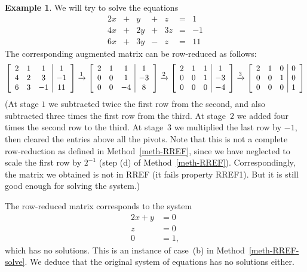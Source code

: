\documentclass[reqno]{amsart}
\theoremstyle{definition}
\newtheorem{example}[theorem]{Example}
\begin{document}
\begin{example}\label{eg-lineqs-i}
 We will try to solve the equations
 \[
 \begin{array}{rcrcrcr}
 2x & + &  y & + &  z & = &  1  \\
 4x & + & 2y & + & 3z & = & -1  \\
 6x & + & 3y & - &  z & = & 11
 \end{array}
 \]
 The corresponding augmented matrix can be row-reduced as follows:
 \[
 \left[
 \begin{array}{ccc|c}
 2 & 1 & 1 & 1 \\
 4 & 2 & 3 & -1 \\
 6 & 3 & -1 & 11
 \end{array}
 \right] \xrightarrow{1} \left[
 \begin{array}{ccc|c}
 2 & 1 & 1 & 1 \\
 0 & 0 & 1 & -3 \\
 0 & 0 & -4 & 8
 \end{array}
 \right] \xrightarrow{2}
 \left[
 \begin{array}{ccc|c}
 2 & 1 & 1 & 1 \\
 0 & 0 & 1 & -3 \\
 0 & 0 & 0 & -4
 \end{array}
 \right] \xrightarrow{3}
 \left[
 \begin{array}{ccc|c}
 2 & 1 & 0 & 0 \\
 0 & 0 & 1 & 0 \\
 0 & 0 & 0 & 1
 \end{array}
 \right]
 \]
 (At stage $1$ we subtracted twice the first row from the second, and
 also subtracted three times the first row from the third.  At
 stage~$2$ we added four times the second row to the third.  At
 stage~$3$ we multiplied the last row by $-1$, then cleared the
 entries above all the pivots.
 Note that this is not a complete row-reduction as defined in
 Method~\ref{meth-RREF}, since we have neglected to scale the first
 row by $2^{-1}$ (step (d) of Method~\ref{meth-RREF}).
 Correspondingly, the matrix we obtained is not in RREF (it fails
 property RREF1).
 But it is still good enough for solving the system.)

 The row-reduced matrix corresponds to the system
 \begin{align*}
  2x + y &= 0 \\
  z &= 0 \\
  0 &= 1,
 \end{align*}
 which has no solutions.  This is an instance of case~(b) in
 Method~\ref{meth-RREF-solve}.  We deduce that the original system of
 equations has no solutions either.


\end{example}
\end{document}
